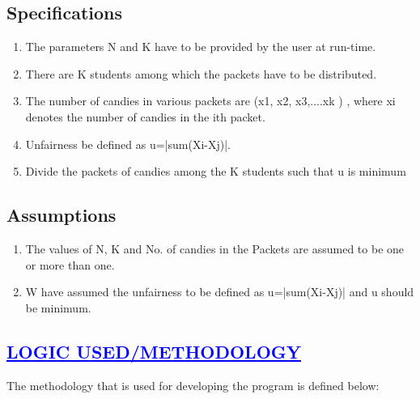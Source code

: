 \documentclass[a4paper,12pt]{report}
\begin{document}
\section*{Specifications}

\begin{enumerate}
\item The parameters N and K have to be provided by the user at run-time.
\item There are K students among which the packets have to be distributed.
\item The number of candies in various packets are (x1, x2, x3,....xk ) , where xi denotes the number of candies in the ith packet.
\item Unfairness be defined as u=|sum(Xi-Xj)|.
\item Divide the packets of candies among the K students such that u is minimum

\end{enumerate}

\section*{Assumptions}

\begin{enumerate}
\item The values of N, K and No. of candies in the Packets are assumed to be one or more than one.
\item W have assumed the unfairness to be defined as u=|sum(Xi-Xj)| and u should be minimum.

\end{enumerate}
 
\begin{center}
\chapter{\textcolor{blue}{\underline {LOGIC USED/METHODOLOGY}}}
\end{center}
The methodology that is used for developing the program is defined below:\\
\end{document}
